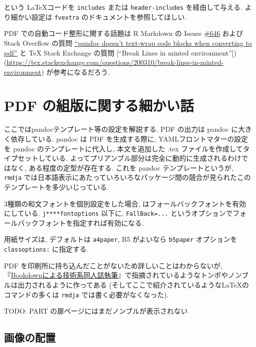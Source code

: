 \documentclass[
]{bxjsbook}
\theoremstyle{definition}
\theoremstyle{definition}
\theoremstyle{definition}
\theoremstyle{remark}
\begin{document}
という \LaTeX コードを \texttt{includes} または \texttt{header-includes}
を経由して与える. より細かい設定は \texttt{fvextra}
のドキュメントを参照してほしい.

PDF での自動コード整形に関する話題は R Markdown の Issues
\href{https://github.com/rstudio/rmarkdown/issues/646}{\#646} および
Stack Overflow の質問
\href{https://stackoverflow.com/questions/20788464/pandoc-doesnt-text-wrap-code-blocks-when-converting-to-pdf}{``pandoc
doesn't text-wrap code blocks when converting to pdf''} と TeX Stack
Exchange の質問 {[}``Break Lines in minted
environment''{]})(\url{https://tex.stackexchange.com/questions/200310/break-lines-in-minted-environment})
が参考になるだろう.

\hypertarget{pdf-ux306eux7d44ux7248ux306bux95a2ux3059ux308bux7d30ux304bux3044ux8a71}{%
\chapter{PDF
の組版に関する細かい話}\label{pdf-ux306eux7d44ux7248ux306bux95a2ux3059ux308bux7d30ux304bux3044ux8a71}}

ここではpandocテンプレート等の設定を解説する. PDF の出力は pandoc
に大きく依存している. pandoc は PDF を生成する際に,
YAMLフロントマターの設定を pandoc のテンプレートに代入し, 本文を追加した
.tex ファイルを作成してタイプセットしている.
よってプリアンブル部分は完全に動的に生成されるわけではなく,
ある程度の定型が存在する. これを pandoc テンプレートというが,
\texttt{rmdja}
では日本語表示にあたっていろいろなパッケージ間の競合が見られたこのテンプレートを多少いじっている.

3種類の和文フォントを個別設定をした場合, \XeLaTeX
はフォールバックフォントを有効にしている. \texttt{j****fontoptions}
以下に, \texttt{FallBack=...}
というオプションでフォールバックフォントを指定すれば有効になる.

用紙サイズは, デフォルトは \texttt{a4paper}, B5 がよいなら
\texttt{b5paper} オプションを \texttt{classoptions:} に指定する.

PDF を印刷所に持ち込んだことがないため詳しいことはわからないが,
『\href{https://teastat.blogspot.com/2019/01/bookdown.html}{Bookdownによる技術系同人誌執筆}』で指摘されているようなトンボやノンブルは出力されるように作ってある
(そしてここで紹介されているようなLaTeXのコマンドの多くは \texttt{rmdja}
では書く必要がなくなった).

TODO: PART の扉ページにはまだノンブルが表示されない

\hypertarget{ux753bux50cfux306eux914dux7f6e}{%
\section{画像の配置}\label{ux753bux50cfux306eux914dux7f6e}}
\end{document}
